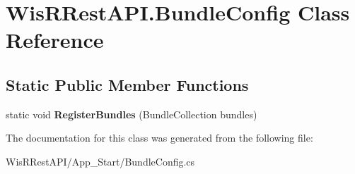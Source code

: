 \hypertarget{class_wis_r_rest_a_p_i_1_1_bundle_config}{}\section{Wis\+R\+Rest\+A\+P\+I.\+Bundle\+Config Class Reference}
\label{class_wis_r_rest_a_p_i_1_1_bundle_config}
\subsection*{Static Public Member Functions}
\begin{DoxyCompactItemize}
\item 
\hypertarget{class_wis_r_rest_a_p_i_1_1_bundle_config_a5ccd267a01bbd78c09153b6558b40d88}{}static void {\bfseries Register\+Bundles} (Bundle\+Collection bundles)\label{class_wis_r_rest_a_p_i_1_1_bundle_config_a5ccd267a01bbd78c09153b6558b40d88}

\end{DoxyCompactItemize}


The documentation for this class was generated from the following file\+:\begin{DoxyCompactItemize}
\item 
Wis\+R\+Rest\+A\+P\+I/\+App\+\_\+\+Start/Bundle\+Config.\+cs\end{DoxyCompactItemize}
